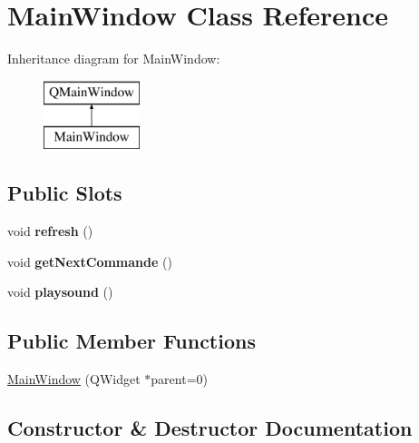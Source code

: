 \hypertarget{class_main_window}{}\section{Main\+Window Class Reference}
\label{class_main_window}
Inheritance diagram for Main\+Window\+:\begin{figure}[H]
\begin{center}
\leavevmode
\includegraphics[height=2.000000cm]{class_main_window}
\end{center}
\end{figure}
\subsection*{Public Slots}
\begin{DoxyCompactItemize}
\item 
void {\bfseries refresh} ()\hypertarget{class_main_window_ab27297114529e4c16d6d8d7a54927a0e}{}\label{class_main_window_ab27297114529e4c16d6d8d7a54927a0e}

\item 
void {\bfseries get\+Next\+Commande} ()\hypertarget{class_main_window_ae9ba81c937937c6218a77ba0ac7a9461}{}\label{class_main_window_ae9ba81c937937c6218a77ba0ac7a9461}

\item 
void {\bfseries playsound} ()\hypertarget{class_main_window_a7d08f1de7502c6b1ff684f85e6009a37}{}\label{class_main_window_a7d08f1de7502c6b1ff684f85e6009a37}

\end{DoxyCompactItemize}
\subsection*{Public Member Functions}
\begin{DoxyCompactItemize}
\item 
\hyperlink{class_main_window_a8b244be8b7b7db1b08de2a2acb9409db}{Main\+Window} (Q\+Widget $\ast$parent=0)
\end{DoxyCompactItemize}


\subsection{Constructor \& Destructor Documentation}
